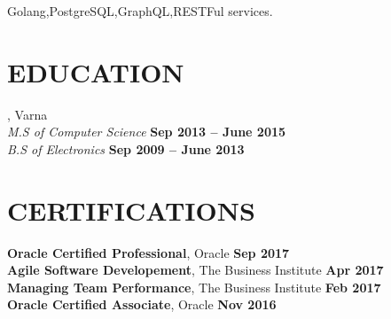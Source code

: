 \documentclass[margin,line]{resume}
\begin{document}
\begin{resume}
    Golang,\hspace{2mm}PostgreSQL,\hspace{2mm}GraphQL,\hspace{2mm}RESTFul services.

\sectionline%

    \section{\mysidestyle\textbf{\large{E}\small{DUCATION}}}

    \textbf{}, Varna \vspace{2mm}\\\vspace{1mm}%
    \textsl{M.S of Computer Science} \hfill \textbf{ Sep 2013 {--} June 2015}\\
    \textsl{B.S of Electronics} \hfill \textbf{ Sep 2009 {--} June 2013}\\

\sectionline%

    \section{\mysidestyle\textbf{\large{C}\small{ERTIFICATIONS}}}

    \textbf{Oracle Certified Professional}, Oracle \hfill \textbf{Sep 2017} \vspace{2mm}\\\vspace{1mm}%
    \textbf{Agile Software Developement}, The Business Institute \hfill \textbf{Apr 2017} \vspace{2mm}\\\vspace{1mm}%
    \textbf{Managing Team Performance}, The Business Institute \hfill \textbf{Feb 2017} \vspace{2mm}\\\vspace{1mm}%
    \textbf{Oracle Certified Associate}, Oracle \hfill \textbf{Nov 2016} \vspace{2mm}\\\vspace{1mm}%

\end{resume}
\end{document}
